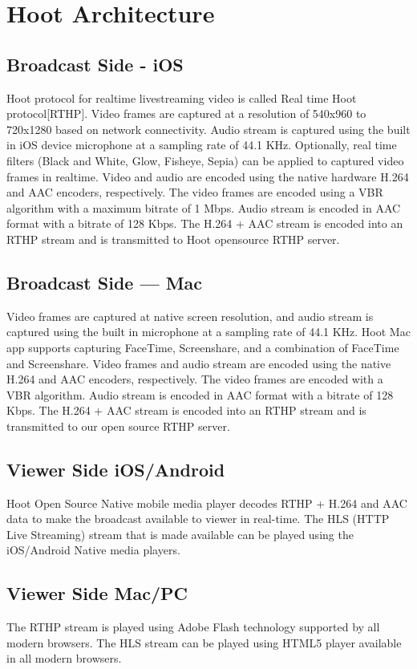 \section{Hoot Architecture}
\subsection{Broadcast Side - iOS}
Hoot protocol for realtime livestreaming video is called Real time Hoot protocol[RTHP].
Video frames are captured at a resolution of 540x960 to 720x1280 based on network connectivity. Audio stream is captured using the built in iOS device microphone at a sampling rate of 44.1 KHz. Optionally, real time filters (Black and White, Glow, Fisheye, Sepia) can be applied to captured video frames in realtime. Video and audio are encoded using the native hardware H.264 and AAC encoders, respectively. The video frames are encoded using a VBR algorithm with a maximum bitrate of 1 Mbps. Audio stream is encoded in AAC format with a bitrate of 128 Kbps. The H.264 + AAC stream is encoded into an RTHP stream and is transmitted to Hoot opensource RTHP server.

\subsection{Broadcast Side — Mac}
Video frames are captured at native screen resolution, and audio stream is captured using the built in microphone at a sampling rate of 44.1 KHz. Hoot Mac app supports capturing FaceTime, Screenshare, and a combination of FaceTime and Screenshare. Video frames and audio stream are encoded using the native H.264 and AAC encoders, respectively. The video frames are encoded with a VBR algorithm. Audio stream is encoded in AAC format with a bitrate of 128 Kbps. The H.264 + AAC stream is encoded into an RTHP stream and is transmitted to our open source RTHP server.

\subsection{Viewer Side iOS/Android }
 Hoot Open Source Native mobile media player decodes RTHP + H.264 and AAC data to make the broadcast available to viewer in real-time. The HLS (HTTP Live Streaming) stream that is made available can be played using the iOS/Android Native media players.

\subsection{Viewer Side Mac/PC} 
The RTHP stream is played using Adobe Flash technology supported by all modern browsers. The HLS stream can be played using HTML5 player available in all modern browsers.


